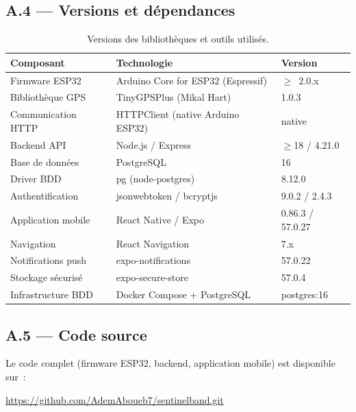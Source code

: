 \documentclass[12pt,a4paper]{article}
\renewcommand{\_}{\textunderscore\allowbreak}
\begin{document}
\subsection*{A.4 --- Versions et dépendances}

\begin{table}[H]
\centering
\caption{Versions des bibliothèques et outils utilisés.}
\small
\begin{tabular}{l l l}
\toprule
\textbf{Composant} & \textbf{Technologie} & \textbf{Version} \\
\midrule
Firmware ESP32 & Arduino Core for ESP32 (Espressif) & $\geq$~2.0.x \\
Bibliothèque GPS & TinyGPSPlus (Mikal Hart) & 1.0.3 \\
Communication HTTP & HTTPClient (native Arduino ESP32) & native \\
Backend API & Node.js / Express & $\geq$18 / 4.21.0 \\
Base de données & PostgreSQL & 16 \\
Driver BDD & pg (node-postgres) & 8.12.0 \\
Authentification & jsonwebtoken / bcryptjs & 9.0.2 / 2.4.3 \\
Application mobile & React Native / Expo & 0.86.3 / 57.0.27 \\
Navigation & React Navigation & 7.x \\
Notifications push & expo-notifications & 57.0.22 \\
Stockage sécurisé & expo-secure-store & 57.0.4 \\
Infrastructure BDD & Docker Compose + PostgreSQL & postgres:16 \\
\bottomrule
\end{tabular}
\end{table}

\subsection*{A.5 --- Code source}

Le code complet (firmware ESP32, backend, application mobile) est disponible sur~:
\begin{center}
\url{https://github.com/AdemAboueb7/sentinelband.git}
\end{center}
\end{document}

